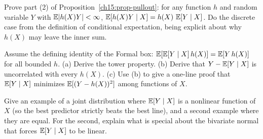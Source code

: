 \begin{exercise}
\label{ch15:exr-proof-pullout}
Prove part (2) of Proposition~\ref{ch15:prop-pullout}: for any function $h$ and random variable $Y$ with
$\operatorname{\mathbb{E}}\lvert h(X)Y\rvert < \infty$, $\operatorname{\mathbb{E}}[h(X)Y \mid X] = h(X)\,\operatorname{\mathbb{E}}[Y\mid X]$. Do the discrete case from the
definition of conditional expectation, being explicit about why $h(X)$ may leave the inner sum.
\end{exercise}

\begin{exercise}
\label{ch15:exr-proof-defining}
Assume the defining identity of the Formal box: $\operatorname{\mathbb{E}}[\operatorname{\mathbb{E}}[Y\mid X]\,h(X)] = \operatorname{\mathbb{E}}[Y\,h(X)]$ for all bounded
$h$. (a) Derive the tower property. (b) Derive that $Y - \operatorname{\mathbb{E}}[Y\mid X]$ is uncorrelated with every
$h(X)$. (c) Use (b) to give a one-line proof that $\operatorname{\mathbb{E}}[Y\mid X]$ minimizes
$\operatorname{\mathbb{E}}[(Y - h(X))^2]$ among functions of $X$.
\end{exercise}

\begin{exercise}
\label{ch15:exr-conceptual}
Give an example of a joint distribution where $\operatorname{\mathbb{E}}[Y\mid X]$ is a nonlinear function of $X$ (so the
best predictor strictly beats the best line), and a second example where they are equal. For the second,
explain what is special about the bivariate normal that forces $\operatorname{\mathbb{E}}[Y\mid X]$ to be linear.
\end{exercise}
